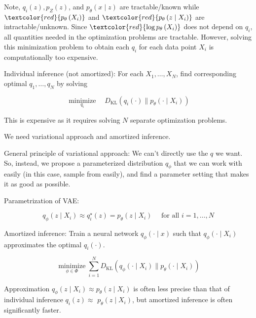 \begin{concept}
    Note, $q_{i}(z), p_{Z}(z)$, and $p_{\theta}(x \mid z)$ are tractable/known while $\textcolor{red}{p_{\theta}\left(X_{i}\right)}$ and $\textcolor{red}{p_{\theta}\left(z \mid X_{i}\right)}$ are intractable/unknown. Since $\textcolor{red}{\log p_{\theta}\left(X_{i}\right)}$ does not depend on $q_{i}$, all quantities needed in the optimization problems are tractable. However, solving this minimization problem to obtain each $q_{i}$ for each data point $X_{i}$ is computationally too expensive.

    \par\noindent\textcolor{gray}{\hdashrule{\textwidth}{0.4pt}{1pt 2pt}}

    Individual inference (not amortized): For each $X_{1}, \ldots, X_{N}$, find corresponding optimal $q_{1}, \ldots, q_{N}$ by solving

    $$
    \underset{q_{i}}{\operatorname{minimize}} \quad D_{\mathrm{KL}}\left(q_{i}(\cdot) \| p_{\theta}\left(\cdot \mid X_{i}\right)\right)
    $$

    This is expensive as it requires solving $N$ separate optimization problems.

    We need variational approach and amortized inference.
\end{concept}

\begin{concept}
    General principle of variational approach: We can't directly use the $q$ we want. So, instead, we propose a parameterized distribution $q_{\phi}$ that we can work with easily (in this case, sample from easily), and find a parameter setting that makes it as good as possible.

    Parametrization of VAE:

    $$
    q_{\phi}\left(z \mid X_{i}\right) \approx q_{i}^{\star}(z)=p_{\theta}\left(z \mid X_{i}\right) \quad \text { for all } i=1, \ldots, N
    $$

    Amortized inference: Train a neural network $q_{\phi}(\cdot \mid x)$ such that $q_{\phi}\left(\cdot \mid X_{i}\right)$ approximates the optimal $q_{i}(\cdot)$.

    $$
    \underset{\phi \in \Phi}{\operatorname{minimize}} \sum_{i=1}^{N} D_{\mathrm{KL}}\left(q_{\phi}\left(\cdot \mid X_{i}\right) \| p_{\theta}\left(\cdot \mid X_{i}\right)\right)
    $$

    Approximation $q_{\phi}\left(z \mid X_{i}\right) \approx p_{\theta}\left(z \mid X_{i}\right)$ is often less precise than that of individual inference $q_{i}(z) \approx$ $p_{\theta}\left(z \mid X_{i}\right)$, but amortized inference is often significantly faster.
\end{concept}

